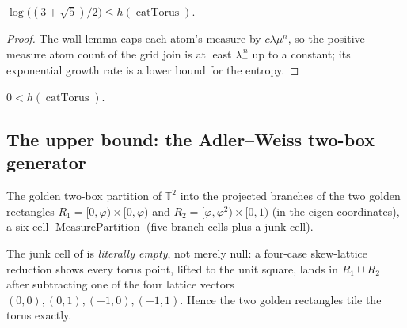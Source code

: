 \begin{theorem}\label{catTorus_ksEntropy_ge}
  \leanok
  \(\log\!\big((3+\sqrt5)/2\big) \le h(\operatorname{catTorus})\).
\end{theorem}
\begin{proof}\leanok
  The wall lemma  caps each atom's measure by
  \(c\lambda\mu^n\), so the positive-measure atom count  of the grid join is at
  least \(\lambda_+^{\,n}\) up to a constant; its exponential growth rate is a lower bound for the
  entropy.
\end{proof}

\begin{corollary}\label{catTorus_ksEntropy_pos}
  \leanok
  \(0 < h(\operatorname{catTorus})\).
\end{corollary}

\subsection{The upper bound: the Adler--Weiss two-box generator}

\begin{definition}\label{catAWPartition}
  \leanok
  The golden two-box partition of \(\mathbb{T}^2\) into the projected branches of the two golden
  rectangles \(R_1 = [0,\varphi)\times[0,\varphi)\) and \(R_2 = [\varphi,\varphi^2)\times[0,1)\) (in
  the eigen-coordinates), a six-cell \(\operatorname{MeasurePartition}\) (five branch cells plus a
  junk cell).
\end{definition}

\begin{lemma}\label{awCell_zero_eq_empty}
  \leanok
  The junk cell of  is \emph{literally empty}, not merely null: a four-case
  skew-lattice reduction shows every torus point, lifted to the unit square, lands in
  \(R_1 \cup R_2\) after subtracting one of the four lattice vectors \((0,0),(0,1),(-1,0),(-1,1)\).
  Hence the two golden rectangles tile the torus exactly.
\end{lemma}

